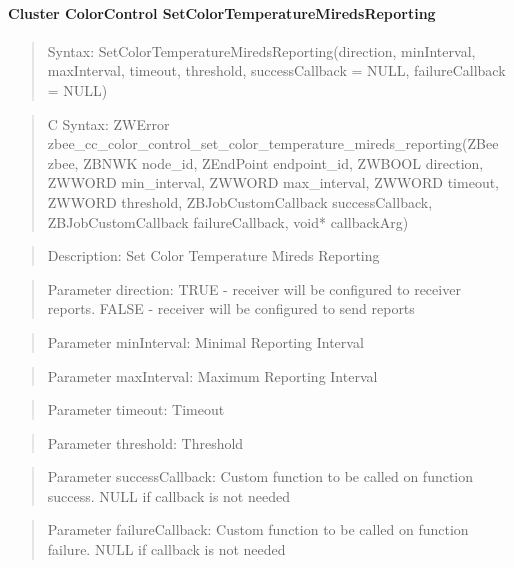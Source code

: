 \paragraph{Cluster ColorControl SetColorTemperatureMiredsReporting}
\begin{quote}Syntax: SetColorTemperatureMiredsReporting(direction, minInterval, maxInterval, timeout, threshold, successCallback = NULL, failureCallback = NULL)\end{quote}
\begin{quote}C Syntax: ZWError zbee\_cc\_color\_control\_set\_color\_temperature\_mireds\_reporting(ZBee zbee, ZBNWK node\_id, ZEndPoint endpoint\_id, ZWBOOL direction, ZWWORD min\_interval, ZWWORD max\_interval, ZWWORD timeout, ZWWORD threshold, ZBJobCustomCallback successCallback, ZBJobCustomCallback failureCallback, void* callbackArg)\end{quote}
\begin{quote}Description: Set Color Temperature Mireds Reporting\end{quote}
\begin{quote}Parameter direction: TRUE  - receiver will be configured to receiver reports. FALSE - receiver will be configured to send reports\end{quote}
\begin{quote}Parameter minInterval: Minimal Reporting Interval\end{quote}
\begin{quote}Parameter maxInterval: Maximum Reporting Interval\end{quote}
\begin{quote}Parameter timeout: Timeout\end{quote}
\begin{quote}Parameter threshold: Threshold\end{quote}
\begin{quote}Parameter successCallback: Custom function to be called on function success. NULL if callback is not needed\end{quote}
\begin{quote}Parameter failureCallback: Custom function to be called on function failure. NULL if callback is not needed\end{quote}


